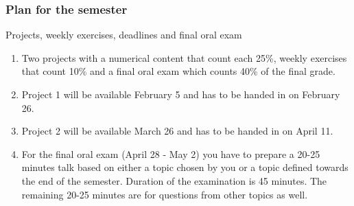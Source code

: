 \documentclass[compress]{beamer}
\begin{document}
\frame
{
  \frametitle{Plan for the semester}
  \begin{block}{Projects, weekly exercises, deadlines and final oral exam}
\begin{enumerate}
\item Two  projects with a numerical content that count each 25\%, weekly exercises  that count 10\% and a final oral exam which counts 40\% of the final grade. 
\item Project 1 will be available February 5 and has to be handed in on February 26.
\item Project 2 will be available March 26 and has to be handed in on April 11. 
\item For the final oral exam (April 28 - May 2) you have to prepare a 20-25 minutes talk based on either a topic chosen by you or a topic defined towards the end of the semester.
Duration of the examination is 45 minutes. The remaining 20-25 minutes are for questions from other topics as well. 
\end{enumerate}

  \end{block}
} 


\end{document}

